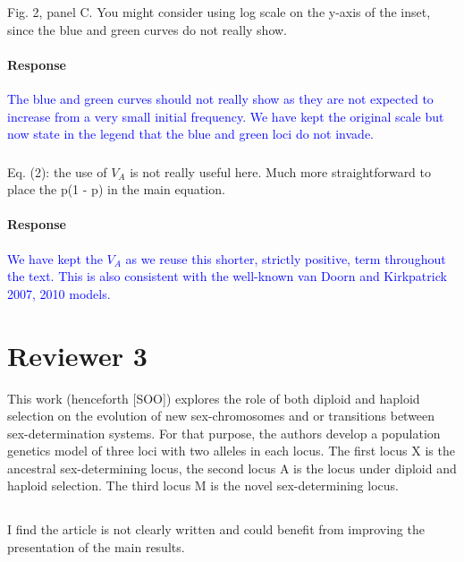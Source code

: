 \documentclass[10pt,letterpaper]{article}
\begin{document}
\noindent\subsubsection{}
Fig. 2, panel C. You might consider using log scale on the y-axis of the inset, since the blue and green curves do not really show.

\noindent\paragraph{Response}
\textcolor{blue}{The blue and green curves should not really show as they are not expected to increase from a very small initial frequency. We have kept the original scale but now state in the legend that the blue and green loci do not invade.}

\noindent\subsubsection{}
Eq. (2): the use of $V_A$ is not really useful here. Much more straightforward to place the p(1 - p) in the main equation.

\noindent\paragraph{Response}
\textcolor{blue}{We have kept the $V_A$ as we reuse this shorter, strictly positive, term throughout the text. This is also consistent with the well-known van Doorn and Kirkpatrick 2007, 2010 models.}

\section{Reviewer 3}

This work (henceforth [SOO]) explores the role of both diploid and haploid selection on the evolution of new sex-chromosomes and or transitions between sex-determination systems. For that purpose, the authors develop a population genetics model of three loci with two alleles in each locus. The first locus X is the ancestral sex-determining locus, the second locus A is the locus under diploid and haploid selection. The third locus M is the novel sex-determining locus.

\noindent\subsection{}
I find the article is not clearly written and could benefit from improving the presentation of the main results. 
\end{document}
